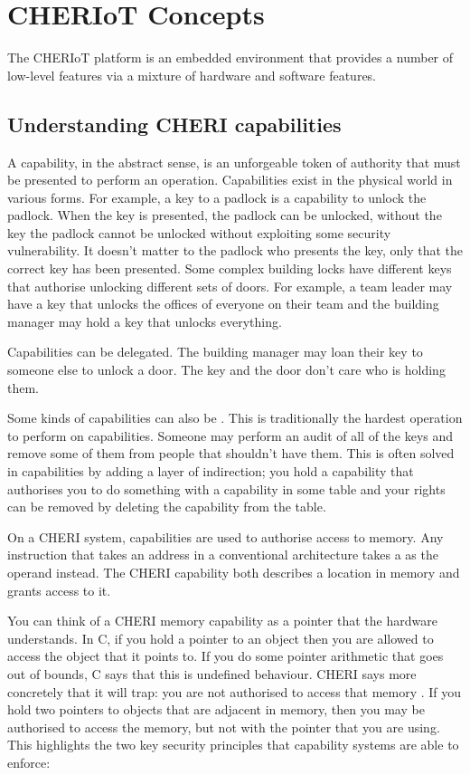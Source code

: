 \chapter{CHERIoT Concepts}

The CHERIoT platform is an embedded environment that provides a number of low-level features via a mixture of hardware and software features.

\section{Understanding CHERI capabilities}

A capability, in the abstract sense, is an unforgeable token of authority that must be presented to perform an operation.
Capabilities exist in the physical world in various forms.
For example, a key to a padlock is a capability to unlock the padlock.
When the key is presented, the padlock can be unlocked, without the key the padlock cannot be unlocked without exploiting some security vulnerability.
It doesn't matter to the padlock who presents the key, only that the correct key has been presented.
Some complex building locks have different keys that authorise unlocking different sets of doors.
For example, a team leader may have a key that unlocks the offices of everyone on their team and the building manager may hold a key that unlocks everything.

Capabilities can be delegated.
The building manager may loan their key to someone else to unlock a door.
The key and the door don't care who is holding them.

Some kinds of capabilities can also be .
This is traditionally the hardest operation to perform on capabilities.
Someone may perform an audit of all of the keys and remove some of them from people that shouldn't have them.
This is often solved in capabilities by adding a layer of indirection; you hold a capability that authorises you to do something with a capability in some table and your rights can be removed by deleting the capability from the table.

On a CHERI system, capabilities are used to authorise access to memory.
Any instruction that takes an address in a conventional architecture takes a  as the operand instead.
The CHERI capability both describes a location in memory and grants access to it.

You can think of a CHERI memory capability as a pointer that the hardware understands.
In C, if you hold a pointer to an object then you are allowed to access the object that it points to.
If you do some pointer arithmetic that goes out of bounds, C says that this is undefined behaviour.
CHERI says more concretely that it will trap: you are not authorised to access that memory .
If you hold two pointers to objects that are adjacent in memory, then you may be authorised to access the memory, but not with the pointer that you are using.
This highlights the two key security principles that capability systems are able to enforce:

